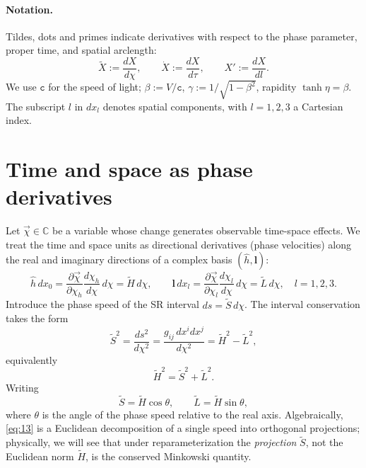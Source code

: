 \documentclass[11pt]{article}
\numberwithin{equation}{section}
\begin{document}
\paragraph{Notation.} Tildes, dots and primes indicate derivatives with respect to the phase parameter, proper time, and spatial arclength:
\[
\tilde{X}:=\frac{dX}{d\chi},\qquad \dot{X}:=\frac{dX}{d\tau},\qquad X':=\frac{dX}{dl}.
\]
We use $\mathtt{c}$ for the speed of light; $\beta:=V/\mathtt{c}$, $\gamma:=1/\sqrt{1-\beta^2}$, rapidity $\tanh\eta=\beta$. The subscript $l$ in $dx_l$ denotes spatial components, with $l=1,2,3$ a Cartesian index.

\section{Time and space as phase derivatives}
Let $\vec{\chi}\in\mathbb{C}$ be a variable whose change generates observable time-space effects. We treat the time and space units as directional derivatives (phase velocities) along the real and imaginary directions of a complex basis $(\hat{h},\mathbf{l})$:
\begin{equation}
\hat{h}\,dx_0=\frac{\partial\vec{\chi}}{\partial\chi_h}\frac{d\chi_h}{d\chi}\,d\chi
=\tilde{H}\,d\chi,\qquad
\mathbf{l}\,dx_l=\frac{\partial\vec{\chi}}{\partial\chi_l}\frac{d\chi_l}{d\chi}\,d\chi
=\tilde{L}\,d\chi,\quad l=1,2,3.
\label{eq:11}
\end{equation}
Introduce the phase speed of the SR interval $ds=\tilde{S}\,d\chi$. The interval conservation takes the form
\begin{equation}
\tilde{S}^2=\frac{ds^2}{d\chi^2}
=\frac{g_{ij}\,dx^i dx^j}{d\chi^2}
=\tilde{H}^2-\tilde{L}^2,
\label{eq:12}
\end{equation}
equivalently
\begin{equation}
\tilde{H}^2=\tilde{S}^2+\tilde{L}^2.
\label{eq:13}
\end{equation}
Writing 
\begin{equation}
\tilde{S}=\tilde{H}\cos\theta,\qquad \tilde{L}=\tilde{H}\sin\theta,
\label{eq:14}
\end{equation}
where $\theta$ is the angle of the phase speed relative to the real axis. Algebraically, \eqref{eq:13} is a Euclidean decomposition of a single speed into orthogonal projections; physically, we will see that under reparameterization the \emph{projection} $\tilde{S}$, not the Euclidean norm $\tilde{H}$, is the conserved Minkowski quantity.
\end{document}
